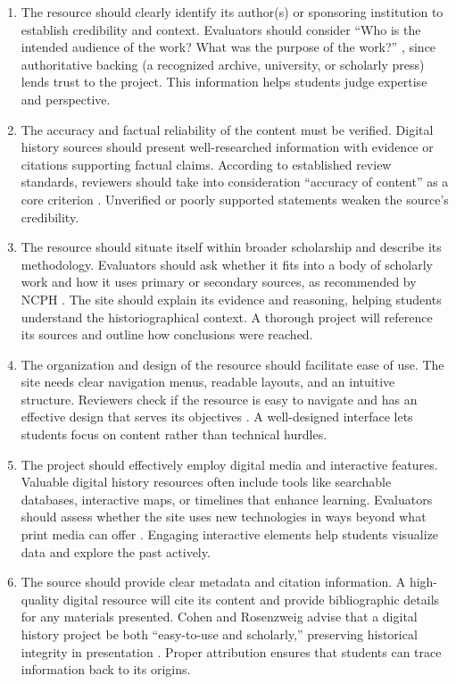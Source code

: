 \begin{enumerate}
\item The resource should clearly identify its author(s) or sponsoring institution to establish credibility and context. Evaluators should consider ``Who is the intended audience of the work? What was the purpose of the work?'' \cite{NCPH2016}, since authoritative backing (a recognized archive, university, or scholarly press) lends trust to the project. This information helps students judge expertise and perspective.
\item The accuracy and factual reliability of the content must be verified. Digital history sources should present well-researched information with evidence or citations supporting factual claims. According to established review standards, reviewers should take into consideration ``accuracy of content'' as a core criterion \cite{NCPH2016}. Unverified or poorly supported statements weaken the source's credibility.
\item The resource should situate itself within broader scholarship and describe its methodology. Evaluators should ask whether it fits into a body of scholarly work and how it uses primary or secondary sources, as recommended by NCPH \cite{NCPH2016}. The site should explain its evidence and reasoning, helping students understand the historiographical context. A thorough project will reference its sources and outline how conclusions were reached.
\item The organization and design of the resource should facilitate ease of use. The site needs clear navigation menus, readable layouts, and an intuitive structure. Reviewers check if the resource is easy to navigate and has an effective design that serves its objectives \cite{NCPH2016}. A well-designed interface lets students focus on content rather than technical hurdles.
\item The project should effectively employ digital media and interactive features. Valuable digital history resources often include tools like searchable databases, interactive maps, or timelines that enhance learning. Evaluators should assess whether the site uses new technologies in ways beyond what print media can offer \cite{NCPH2016}. Engaging interactive elements help students visualize data and explore the past actively.
\item The source should provide clear metadata and citation information. A high-quality digital resource will cite its content and provide bibliographic details for any materials presented. Cohen and Rosenzweig advise that a digital history project be both ``easy-to-use and scholarly,'' preserving historical integrity in presentation \cite{CohenRosenzweig2006}. Proper attribution ensures that students can trace information back to its origins.

\end{enumerate}
